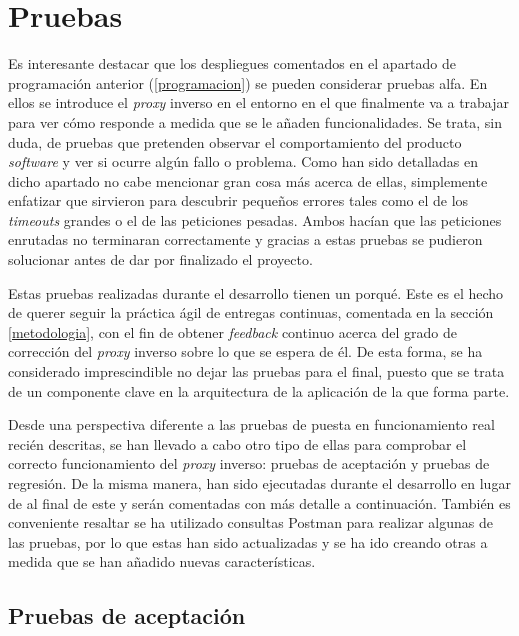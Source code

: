 \documentclass[11pt,spanish,listoffigures]{tfgetsinf}
\begin{document}

	\section{Pruebas} \label{pruebas}

Es interesante destacar que los despliegues comentados en el apartado de programación anterior (\ref{programacion}) se pueden considerar pruebas alfa. En ellos se introduce el \emph{proxy} inverso en el entorno en el que finalmente va a trabajar para ver cómo responde a medida que se le añaden funcionalidades. Se trata, sin duda, de pruebas que pretenden observar el comportamiento del producto \emph{software} y ver si ocurre algún fallo o problema. Como han sido detalladas en dicho apartado no cabe mencionar gran cosa más acerca de ellas, simplemente enfatizar que sirvieron para descubrir pequeños errores tales como el de los \emph{timeouts} grandes o el de las peticiones pesadas. Ambos hacían que las peticiones enrutadas no terminaran correctamente y gracias a estas pruebas se pudieron solucionar antes de dar por finalizado el proyecto.

Estas pruebas realizadas durante el desarrollo tienen un porqué. Este es el hecho de querer seguir la práctica ágil de entregas continuas, comentada en la sección \ref{metodologia}, con el fin de obtener \emph{feedback} continuo acerca del grado de corrección del \emph{proxy} inverso sobre lo que se espera de él. De esta forma, se ha considerado imprescindible no dejar las pruebas para el final, puesto que se trata de un componente clave en la arquitectura de la aplicación de la que forma parte.

Desde una perspectiva diferente a las pruebas de puesta en funcionamiento real recién descritas, se han llevado a cabo otro tipo de ellas para comprobar el correcto funcionamiento del \emph{proxy} inverso: pruebas de aceptación y pruebas de regresión. De la misma manera, han sido ejecutadas durante el desarrollo en lugar de al final de este y serán comentadas con más detalle a continuación. También es conveniente resaltar se ha utilizado consultas Postman para realizar algunas de las pruebas, por lo que estas han sido actualizadas y se ha ido creando otras a medida que se han añadido nuevas características.


		\subsection{Pruebas de aceptación} \label{pruebasDeAceptacion}
\end{document}
